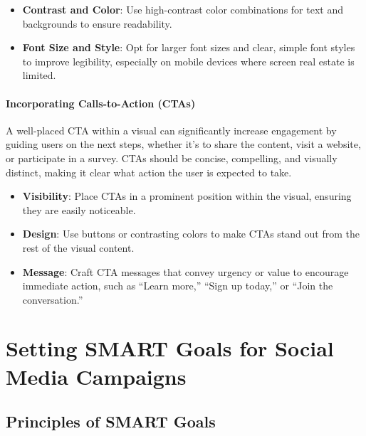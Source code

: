 \documentclass[
]{book}
\providecommand{\tightlist}{%
  \setlength{\itemsep}{0pt}\setlength{\parskip}{0pt}}
\begin{document}
\begin{itemize}
\tightlist
\item
  \textbf{Contrast and Color}: Use high-contrast color combinations for text and backgrounds to ensure readability.
\item
  \textbf{Font Size and Style}: Opt for larger font sizes and clear, simple font styles to improve legibility, especially on mobile devices where screen real estate is limited.
\end{itemize}

\hypertarget{incorporating-calls-to-action-ctas}{%
\subsubsection*{Incorporating Calls-to-Action (CTAs)}\label{incorporating-calls-to-action-ctas}}

A well-placed CTA within a visual can significantly increase engagement by guiding users on the next steps, whether it's to share the content, visit a website, or participate in a survey. CTAs should be concise, compelling, and visually distinct, making it clear what action the user is expected to take.

\begin{itemize}
\tightlist
\item
  \textbf{Visibility}: Place CTAs in a prominent position within the visual, ensuring they are easily noticeable.
\item
  \textbf{Design}: Use buttons or contrasting colors to make CTAs stand out from the rest of the visual content.
\item
  \textbf{Message}: Craft CTA messages that convey urgency or value to encourage immediate action, such as ``Learn more,'' ``Sign up today,'' or ``Join the conversation.''
\end{itemize}

\hypertarget{setting-smart-goals-for-social-media-campaigns}{%
\chapter{Setting SMART Goals for Social Media Campaigns}\label{setting-smart-goals-for-social-media-campaigns}}

\hypertarget{principles-of-smart-goals}{%
\section*{Principles of SMART Goals}\label{principles-of-smart-goals}}
\end{document}
